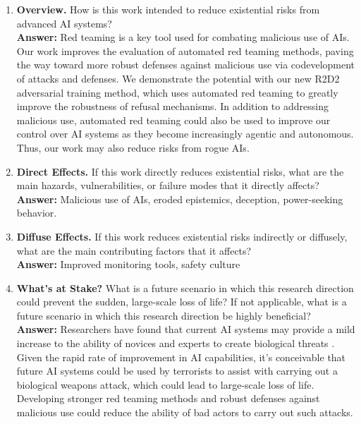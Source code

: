 \begin{enumerate}[leftmargin=*]
    \item \textbf{Overview.} How is this work intended to reduce existential risks from advanced AI systems? \\
    \textbf{Answer:} 
    Red teaming is a key tool used for combating malicious use of AIs. Our work improves the evaluation of automated red teaming methods, paving the way toward more robust defenses against malicious use via codevelopment of attacks and defenses. We demonstrate the potential with our new R2D2 adversarial training method, which uses automated red teaming to greatly improve the robustness of refusal mechanisms. In addition to addressing malicious use, automated red teaming could also be used to improve our control over AI systems as they become increasingly agentic and autonomous. Thus, our work may also reduce risks from rogue AIs.

    \item \textbf{Direct Effects.} If this work directly reduces existential risks, what are the main hazards, vulnerabilities, or failure modes that it directly affects? \\
    \textbf{Answer:} 
    Malicious use of AIs, eroded epistemics, deception, power-seeking behavior.

    \item \textbf{Diffuse Effects.} If this work reduces existential risks indirectly or diffusely, what are the main contributing factors that it affects? \\
    \textbf{Answer:} 
    Improved monitoring tools, safety culture

    \item \textbf{What's at Stake?} What is a future scenario in which this research direction could prevent the sudden, large-scale loss of life? If not applicable, what is a future scenario in which this research direction be highly beneficial? \\
    \textbf{Answer:} 
    Researchers have found that current AI systems may provide a mild increase to the ability of novices and experts to create biological threats \citep{openai_2024_early_warning}. Given the rapid rate of improvement in AI capabilities, it's conceivable that future AI systems could be used by terrorists to assist with carrying out a biological weapons attack, which could lead to large-scale loss of life. Developing stronger red teaming methods and robust defenses against malicious use could reduce the ability of bad actors to carry out such attacks.
    

\end{enumerate}
